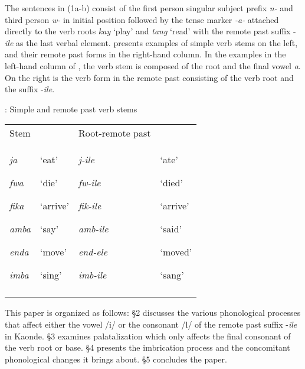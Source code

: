 \documentclass[output=paper]{langsci/langscibook}
\begin{document}
The sentences in (1a-b) consist of the first person singular subject prefix \emph{n-} and third person \emph{w-} in initial position followed by the tense marker \emph{{}-a-} attached directly to the verb roots \emph{kay} ‘play’ and \textit{tang} ‘read’ with the remote past suffix -\emph{ile} as the last verbal element.  presents examples of simple verb stems on the left, and their remote past forms in the right-hand column. In the examples in the left-hand column of , the verb stem is composed of the root and the final vowel \textit{a}. On the right is the verb form in the remote past consisting of the verb root and the suffix -\textit{ile}.

\begin{stylelsTableHeading}
 : Simple and remote past verb stems
\end{stylelsTableHeading}

\begin{tabular}{llll}
\lsptoprule
\mdseries Stem &  & \mdseries Root-remote past & \\
{\mdseries \emph{ja }}

{\mdseries \emph{fwa }}

{\mdseries \emph{fika }}

{\mdseries \emph{amba }}

{\mdseries \emph{enda }}

\mdseries \emph{imba} & {\mdseries ‘eat’}

{\mdseries ‘die’}

{\mdseries ‘arrive’  }

{\mdseries ‘say’}

{\mdseries ‘move’  }

\mdseries ‘sing’ & {\mdseries \emph{j-ile}}

{\mdseries \emph{fw-ile}}

{\mdseries \emph{fik-ile}}

{\mdseries \emph{amb-ile}}

{\mdseries \emph{end-ele  }}

\mdseries \emph{imb-ile  } & {\mdseries ‘ate’}

{\mdseries ‘died’}

{\mdseries ‘arrive’}

{\mdseries ‘said’}

{\mdseries ‘moved’}

\mdseries ‘sang’\\
\lspbottomrule
\end{tabular}
\begin{styleBodyTextIndent}
This paper is organized as follows: §2 discusses the various phonological processes that affect either the vowel /i/ or the consonant /l/ of the remote past suffix -\emph{ile} in Kaonde. §3 examines palatalization which only affects the final consonant of the verb root or base. §4 presents the imbrication process and the concomitant phonological changes it brings about. §5 concludes the paper.
\end{styleBodyTextIndent}
\end{document}
